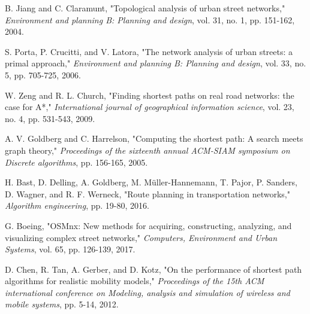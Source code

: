 \documentclass[conference]{IEEEtran}
\begin{document}
\begin{thebibliography}{00}
 B. Jiang and C. Claramunt, "Topological analysis of urban street networks," \textit{Environment and planning B: Planning and design}, vol. 31, no. 1, pp. 151-162, 2004.

 S. Porta, P. Crucitti, and V. Latora, "The network analysis of urban streets: a primal approach," \textit{Environment and planning B: Planning and design}, vol. 33, no. 5, pp. 705-725, 2006.

 W. Zeng and R. L. Church, "Finding shortest paths on real road networks: the case for A*," \textit{International journal of geographical information science}, vol. 23, no. 4, pp. 531-543, 2009.

 A. V. Goldberg and C. Harrelson, "Computing the shortest path: A search meets graph theory," \textit{Proceedings of the sixteenth annual ACM-SIAM symposium on Discrete algorithms}, pp. 156-165, 2005.

 H. Bast, D. Delling, A. Goldberg, M. Müller-Hannemann, T. Pajor, P. Sanders, D. Wagner, and R. F. Werneck, "Route planning in transportation networks," \textit{Algorithm engineering}, pp. 19-80, 2016.

 G. Boeing, "OSMnx: New methods for acquiring, constructing, analyzing, and visualizing complex street networks," \textit{Computers, Environment and Urban Systems}, vol. 65, pp. 126-139, 2017.

 D. Chen, R. Tan, A. Gerber, and D. Kotz, "On the performance of shortest path algorithms for realistic mobility models," \textit{Proceedings of the 15th ACM international conference on Modeling, analysis and simulation of wireless and mobile systems}, pp. 5-14, 2012.

\end{thebibliography}
\end{document}
